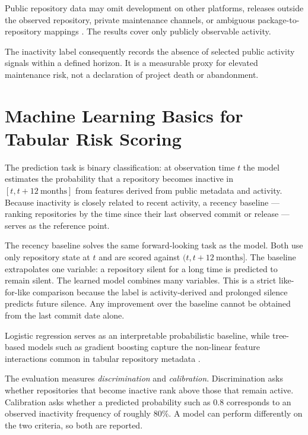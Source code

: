 Public repository data may omit development on other platforms, releases outside
the observed repository, private maintenance channels, or ambiguous
package-to-repository mappings \cite{kalliamvakou2016perils}. The results cover
only publicly observable activity.

The inactivity label consequently records the absence of selected public
activity signals within a defined horizon. It is a measurable proxy for elevated
maintenance risk, not a declaration of project death or abandonment.

\section{Machine Learning Basics for Tabular Risk Scoring}
\label{sec:background-ml-basics}

The prediction task is binary classification: at observation time \(t\) the model estimates the probability that a repository becomes inactive in \( [t, t + 12\ \text{months}] \) from features derived from public metadata and activity. Because inactivity is closely related to recent activity, a recency baseline --- ranking repositories by the time since their last observed commit or release --- serves as the reference point.

The recency baseline solves the same forward-looking task as the model. Both use
only repository state at \(t\) and are scored against
\( (t, t + 12\ \text{months}] \). The baseline extrapolates one variable: a
repository silent for a long time is predicted to remain silent. The learned
model combines many variables. This is a strict like-for-like comparison because
the label is activity-derived and prolonged silence predicts future silence.
Any improvement over the baseline cannot be obtained from the last commit date
alone.

Logistic regression serves as an interpretable probabilistic baseline, while tree-based models such as gradient boosting capture the non-linear feature interactions common in tabular repository metadata \cite{james2021islr,breiman2001randomforests,friedman2001greedy}.

The evaluation measures \emph{discrimination} and \emph{calibration}.
Discrimination asks whether repositories that become inactive rank above those
that remain active. Calibration asks whether a predicted probability such as
\(0.8\) corresponds to an observed inactivity frequency of roughly \(80\%\).
A model can perform differently on the two criteria, so both are reported.

